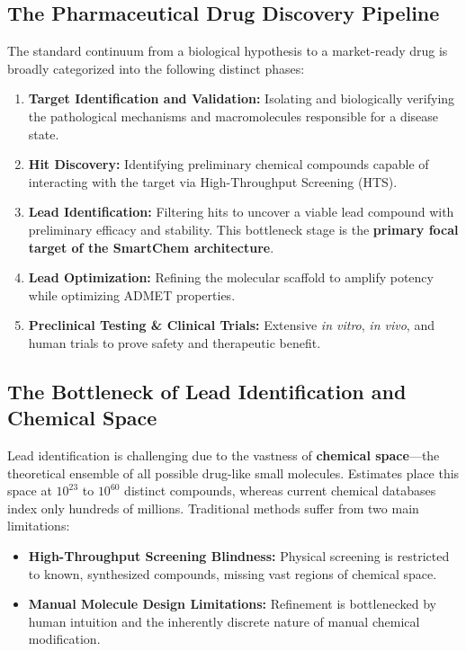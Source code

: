 \documentclass[12pt,a4paper]{report}
\begin{document}
\subsection{The Pharmaceutical Drug Discovery Pipeline}

The standard continuum from a biological hypothesis to a market-ready drug is broadly categorized into the following distinct phases:

\begin{enumerate}
    \item \textbf{Target Identification and Validation:} Isolating and biologically verifying the pathological mechanisms and macromolecules responsible for a disease state.
    \item \textbf{Hit Discovery:} Identifying preliminary chemical compounds capable of interacting with the target via High-Throughput Screening (HTS).
    \item \textbf{Lead Identification:} Filtering hits to uncover a viable lead compound with preliminary efficacy and stability. This bottleneck stage is the \textbf{primary focal target of the SmartChem architecture}.
    \item \textbf{Lead Optimization:} Refining the molecular scaffold to amplify potency while optimizing ADMET properties.
    \item \textbf{Preclinical Testing \& Clinical Trials:} Extensive \textit{in vitro}, \textit{in vivo}, and human trials to prove safety and therapeutic benefit.
\end{enumerate}

\subsection{The Bottleneck of Lead Identification and Chemical Space}

Lead identification is challenging due to the vastness of \textbf{chemical space}—the theoretical ensemble of all possible drug-like small molecules. Estimates place this space at $10^{23}$ to $10^{60}$ distinct compounds, whereas current chemical databases index only hundreds of millions. Traditional methods suffer from two main limitations:
\begin{itemize}
    \item \textbf{High-Throughput Screening Blindness:} Physical screening is restricted to known, synthesized compounds, missing vast regions of chemical space.
    \item \textbf{Manual Molecule Design Limitations:} Refinement is bottlenecked by human intuition and the inherently discrete nature of manual chemical modification.
\end{itemize}
\end{document}
